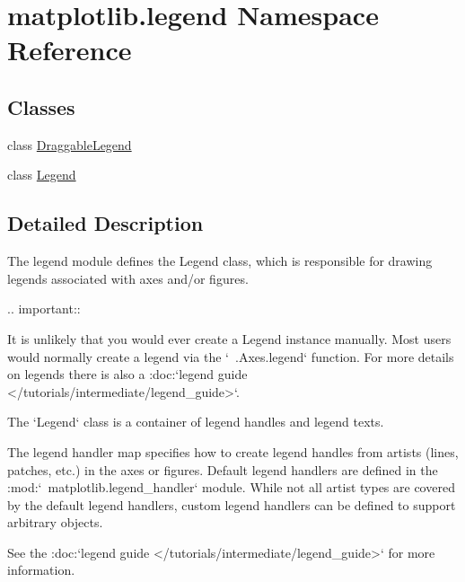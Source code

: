 \hypertarget{namespacematplotlib_1_1legend}{}\section{matplotlib.\+legend Namespace Reference}
\label{namespacematplotlib_1_1legend}
\subsection*{Classes}
\begin{DoxyCompactItemize}
\item 
class \hyperlink{classmatplotlib_1_1legend_1_1DraggableLegend}{Draggable\+Legend}
\item 
class \hyperlink{classmatplotlib_1_1legend_1_1Legend}{Legend}
\end{DoxyCompactItemize}


\subsection{Detailed Description}
\begin{DoxyVerb}The legend module defines the Legend class, which is responsible for
drawing legends associated with axes and/or figures.

.. important::

    It is unlikely that you would ever create a Legend instance manually.
    Most users would normally create a legend via the `~.Axes.legend`
    function. For more details on legends there is also a :doc:`legend guide
    </tutorials/intermediate/legend_guide>`.

The `Legend` class is a container of legend handles and legend texts.

The legend handler map specifies how to create legend handles from artists
(lines, patches, etc.) in the axes or figures. Default legend handlers are
defined in the :mod:`~matplotlib.legend_handler` module. While not all artist
types are covered by the default legend handlers, custom legend handlers can be
defined to support arbitrary objects.

See the :doc:`legend guide </tutorials/intermediate/legend_guide>` for more
information.
\end{DoxyVerb}
 